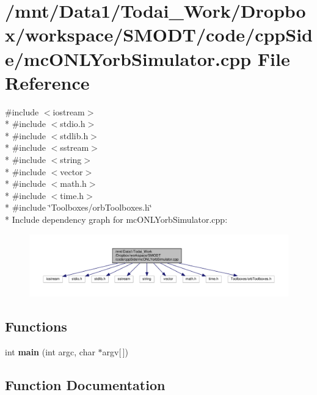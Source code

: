 \section{/mnt/\-Data1/\-Todai\-\_\-\-Work/\-Dropbox/workspace/\-S\-M\-O\-D\-T/code/cpp\-Side/mc\-O\-N\-L\-Yorb\-Simulator.cpp File Reference}
\label{mc_o_n_l_yorb_simulator_8cpp}
{\ttfamily \#include $<$iostream$>$}\\*
{\ttfamily \#include $<$stdio.\-h$>$}\\*
{\ttfamily \#include $<$stdlib.\-h$>$}\\*
{\ttfamily \#include $<$sstream$>$}\\*
{\ttfamily \#include $<$string$>$}\\*
{\ttfamily \#include $<$vector$>$}\\*
{\ttfamily \#include $<$math.\-h$>$}\\*
{\ttfamily \#include $<$time.\-h$>$}\\*
{\ttfamily \#include \char`\"{}Toolboxes/orb\-Toolboxes.\-h\char`\"{}}\\*
Include dependency graph for mc\-O\-N\-L\-Yorb\-Simulator.\-cpp\-:\nopagebreak
\begin{figure}[H]
\begin{center}
\leavevmode
\includegraphics[width=350pt]{mc_o_n_l_yorb_simulator_8cpp__incl}
\end{center}
\end{figure}
\subsection*{Functions}
\begin{DoxyCompactItemize}
\item 
int {\bf main} (int argc, char $\ast$argv[$\,$])
\end{DoxyCompactItemize}


\subsection{Function Documentation}
